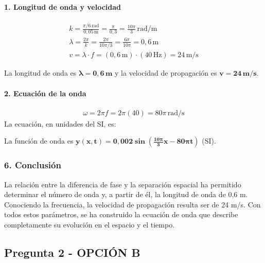 \paragraph{1. Longitud de onda y velocidad}
\begin{gather}
    k = \frac{\pi/6\,\text{rad}}{0,05\,\text{m}} = \frac{\pi}{0,3} = \frac{10\pi}{3}\,\text{rad/m} \\
    \lambda = \frac{2\pi}{k} = \frac{2\pi}{10\pi/3} = \frac{6\pi}{10\pi} = 0,6\,\text{m} \\
    v = \lambda \cdot f = (0,6\,\text{m}) \cdot (40\,\text{Hz}) = 24\,\text{m/s}
\end{gather}
\begin{cajaresultado}
La longitud de onda es $\boldsymbol{\lambda=0,6\,\textbf{m}}$ y la velocidad de propagación es $\boldsymbol{v=24\,\textbf{m/s}}$.
\end{cajaresultado}

\paragraph{2. Ecuación de la onda}
\begin{gather}
    \omega = 2\pi f = 2\pi(40) = 80\pi\,\text{rad/s}
\end{gather}
La ecuación, en unidades del SI, es:
\begin{cajaresultado}
La función de onda es $\boldsymbol{y(x,t) = 0,002\sin\left(\frac{10\pi}{3}x - 80\pi t\right)}$ (SI).
\end{cajaresultado}

\subsubsection*{6. Conclusión}
\begin{cajaconclusion}
La relación entre la diferencia de fase y la separación espacial ha permitido determinar el número de onda y, a partir de él, la longitud de onda de 0,6 m. Conociendo la frecuencia, la velocidad de propagación resulta ser de 24 m/s. Con todos estos parámetros, se ha construido la ecuación de onda que describe completamente su evolución en el espacio y el tiempo.
\end{cajaconclusion}

\newpage

\subsection{Pregunta 2 - OPCIÓN B}
\label{subsec:2B_2007_sep_ext}

